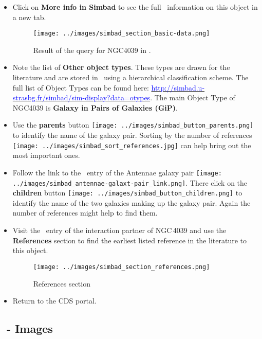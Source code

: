 \documentclass [a4paper, 12pt]{article}
\begin{document}
\begin{itemize}
    \item Click on \textbf{More info in Simbad} to see the full \simbad\
information on this object in a new tab.
\begin{figure}[H]
    \center
    \texttt{[image: ../images/simbad\_section\_basic-data.png]}
    \caption{Result of the query for NGC4039 in \simbad.}
    \label{fig:simbad}
\end{figure}
    \item Note the list of \textbf{Other object types}. These types are
drawn for the literature and are stored in \simbad\ using a
hierarchical classification scheme. The full list of Object Types can
be found here:
\href{http://simbad.u-strasbg.fr/simbad/sim-display?data=otypes}
{\textcolor{blue}{http://simbad.u-strasbg.fr/simbad/sim-display?data=otypes}}.
The main Object Type of NGC4039 is \textbf{Galaxy in Pairs of Galaxies
(GiP)}.
    \item Use the {\bf parents} button \texttt{[image: ../images/simbad\_button\_parents.png]} to identify the name
of the galaxy pair. Sorting by the number of references
\texttt{[image: ../images/simbad\_sort\_references.jpg]}
can help bring out the most important ones.
    \item Follow the link to the \simbad\ entry of the Antennae galaxy pair
\texttt{[image: ../images/simbad\_antennae-galaxt-pair\_link.png]}. There
click on the {\bf children} button \texttt{[image: ../images/simbad\_button\_children.png]} to identify the name
of the two galaxies making up the galaxy pair. Again the number of references
might help to find them.
    \item Visit the \simbad\ entry of the interaction partner of NGC\,4039 and
use the {\bf References} section to find the earliest listed reference in the
literature to this object.
\begin{figure}[H]
    \center
    \texttt{[image: ../images/simbad\_section\_references.png]}
    \caption{References section}
    \label{fig:simbad_references}
\end{figure}

    \item Return to the CDS portal.
\end{itemize}




\subsection{\aladin\ - Images}
\end{document}
